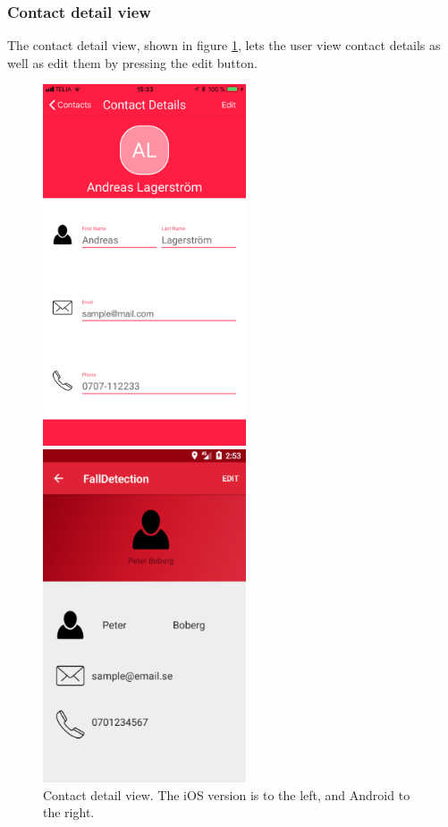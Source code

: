 \documentclass[12pt, a4paper, onecolumn]{article}
\begin{document}
	\newpage
	\subsubsection{Contact detail view}
	
	The contact detail view, shown in figure \ref{fig:contacts-detail-screen}, lets the user view contact details as well as edit them by pressing the edit button. 
	
	\begin{figure}[H]
		\begin{multicols}{2}
			\centering
			\includegraphics[width=6cm]{../img/screenshots/contacts-detail-screen.jpg}\par 
			\includegraphics[width=6cm]{../img/screenshots/contacts-detail-screen-android.png}\par 
		\end{multicols}
		\caption{Contact detail view. The iOS version is to the left, and Android to the right.}%
		\label{fig:contacts-detail-screen}%
	\end{figure}
	
\end{document}
